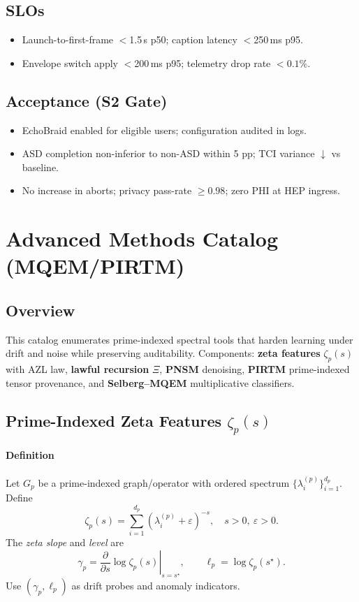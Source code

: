 \documentclass[11pt]{article}
\theoremstyle{plain}
\begin{document}
\subsection{SLOs}
\begin{itemize}
  \item Launch-to-first-frame $<$1.5\,s p50; caption latency $<$250\,ms p95.
  \item Envelope switch apply $<$200\,ms p95; telemetry drop rate $<0.1\%$.
\end{itemize}

\subsection{Acceptance (S2 Gate)}
\begin{itemize}
  \item EchoBraid enabled for eligible users; configuration audited in logs.
  \item ASD completion non-inferior to non-ASD within 5 pp; TCI variance $\downarrow$ vs baseline.
  \item No increase in aborts; privacy pass-rate $\ge 0.98$; zero PHI at HEP ingress.
\end{itemize}

\section{Advanced Methods Catalog (MQEM/PIRTM)}

\subsection{Overview}
This catalog enumerates prime-indexed spectral tools that harden learning under drift and noise while preserving auditability. Components: \textbf{zeta features} $\zeta_p(s)$ with AZL law, \textbf{lawful recursion} $\Xi$, \textbf{PNSM} denoising, \textbf{PIRTM} prime-indexed tensor provenance, and \textbf{Selberg--MQEM} multiplicative classifiers.

\subsection{Prime-Indexed Zeta Features \texorpdfstring{$\zeta_p(s)$}{zeta\_p(s)}}
\paragraph{Definition}
Let $G_p$ be a prime-indexed graph/operator with ordered spectrum $\{\lambda^{(p)}_i\}_{i=1}^{d_p}$. Define
\[
\zeta_p(s)=\sum_{i=1}^{d_p}\left(\lambda^{(p)}_i+\varepsilon\right)^{-s},\quad s>0,\ \varepsilon>0.
\]
The \emph{zeta slope} and \emph{level} are
\[
\gamma_p=\left.\frac{\partial}{\partial s}\log \zeta_p(s)\right|_{s=s^\star},
\qquad
\ell_p=\log \zeta_p(s^\star).
\]
Use $(\gamma_p,\ell_p)$ as drift probes and anomaly indicators.
\end{document}
